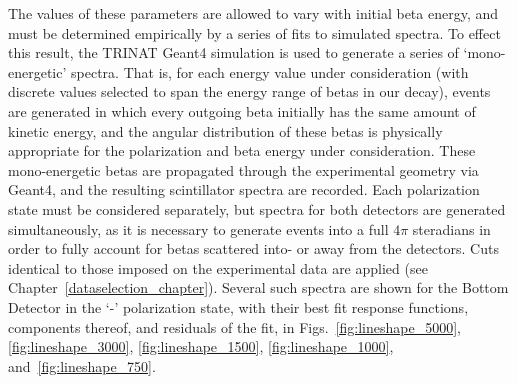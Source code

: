 The values of these parameters are allowed to vary with initial beta energy, and must be determined empirically by a series of fits to simulated spectra.  
To effect this result, the TRINAT Geant4 simulation is used to generate a series of `mono-energetic' spectra.  That is, for each energy value under consideration (with discrete values selected to span the energy range of betas in our decay), events are generated in which every outgoing beta initially has the same amount of kinetic energy, and the angular distribution of these betas is physically appropriate for the polarization and beta energy under consideration.  These mono-energetic betas are propagated through the experimental geometry via Geant4, and the resulting scintillator spectra are recorded.  Each polarization state must be considered separately, but spectra for both detectors are generated simultaneously, as it is necessary to generate events into a full $4\pi$ steradians in order to fully account for betas scattered into- or away from the detectors.  Cuts identical to those imposed on the experimental data are applied (see Chapter~\ref{dataselection_chapter}).  Several such spectra are shown for the Bottom Detector in the `-' polarization state, with their best fit response functions, components thereof, and residuals of the fit, in Figs.~\ref{fig:lineshape_5000}, \ref{fig:lineshape_3000}, \ref{fig:lineshape_1500}, \ref{fig:lineshape_1000}, and~\ref{fig:lineshape_750}.

